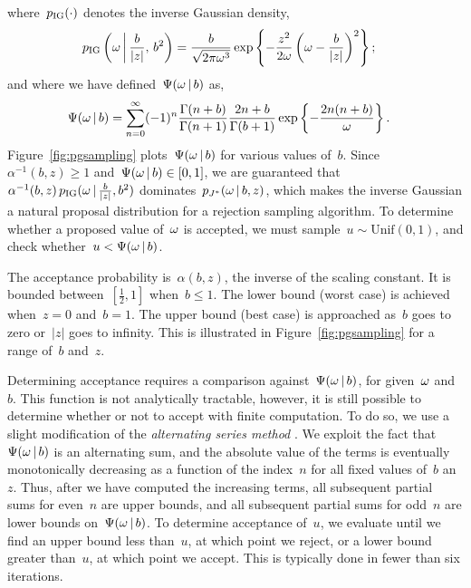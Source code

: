 where~$p_{\mathrm{IG}}(\cdot)$ denotes the inverse Gaussian density,
\begin{align*}
p_{\mathrm{IG}} \left({\omega} \, \bigg| \, \frac{b}{|z|}, \, b^2 \right) 
  &= \frac{b}{\sqrt{2\pi {\omega}^3}}
    \exp \left \{ - \frac{z^2}{2{\omega}}  \left({\omega} - \frac{b}{|z|} \right)^2   \right \};
\end{align*}
and where we have defined~$\Psi({\omega} \,|\, b)$ as,
\begin{align*}
  \Psi({\omega} \,|\, b)  
  &= \sum_{n=0}^\infty (-1)^n \frac{\Gamma(n+b)}{\Gamma(n+1)} \frac{2n+b}{\Gamma(b+1)}
    \exp\left\{- \frac{2n(n+b)}{{\omega}} \right\}.  
\end{align*}
Figure~\ref{fig:pgsampling} plots~$\Psi({\omega} \,|\, b)$ for various values of~$b$.
Since~$\alpha^{-1}(b,z)\geq 1$ and~$\Psi({\omega} \,|\, b) \in [0,1]$,
we are guaranteed that~${\alpha^{-1}(b,z)\,
  p_{\mathrm{IG}}({\omega} \,|\, \tfrac{b}{|z|}, b^2)}$
dominates~$p_{J^{*}}({\omega} \,|\, b,z)$, which makes the
inverse Gaussian a natural proposal distribution for a rejection
sampling algorithm.  To determine whether a proposed value of~${\omega}$
is accepted, we must sample~$u \sim \mathrm{Unif}(0,1)$, and check
whether~$u < \Psi({\omega} \,|\, b)$.

The acceptance probability is~$\alpha(b,z)$, the inverse of the
scaling constant. It is bounded
between~$[\tfrac{1}{2}, 1]$ when~$b \leq 1$.
The lower bound (worst case) is achieved when~$z=0$ and~$b=1$.
The upper bound (best case) is approached as~$b$ goes to zero or~$|z|$ goes 
to infinity.
This is illustrated in Figure~\ref{fig:pgsampling} for a 
range of~$b$ and~$z$.

Determining acceptance requires a comparison against~$\Psi({\omega}
\,|\, b)$, for given~${\omega}$ and~$b$. This function is not
analytically tractable, however, it is still possible to determine
whether or not to accept with finite computation. To do so, we use a
slight modification of the \emph{alternating series method}
\cite{devroye1986}.  We exploit the fact that ~$\Psi({\omega} \,|\, b)$
is an alternating sum, and the absolute value of the terms is
eventually monotonically decreasing as a function of the index~$n$ for
all fixed values of~$b$ an~$z$.  Thus, after we have computed the
increasing terms, all subsequent partial sums for even~$n$ are upper
bounds, and all subsequent partial sums for odd~$n$ are lower bounds
on~$\Psi({\omega}\,|\, b)$.  To determine acceptance of~$u$, we
evaluate until we find an upper bound less than~$u$, at which point we
reject, or a lower bound greater than~$u$, at which point we
accept. This is typically done in fewer than six iterations. 
